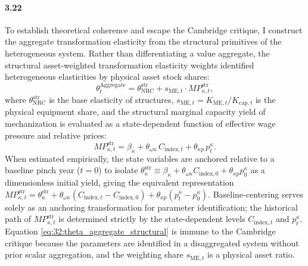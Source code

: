\paragraph{3.22}
To establish theoretical coherence and escape the Cambridge critique, I construct the aggregate transformation elasticity from the structural primitives of the heterogeneous system. Rather than differentiating a value aggregate, the structural asset-weighted transformation elasticity weights identified heterogeneous elasticities by physical asset stock shares:
\begin{equation}
	\theta^{\text{Aggregate}}_t = \theta_{\text{NRC}}^{\text{str}} + s_{\text{ME},t} \cdot MP_{\kappa,t}^{\text{str}},
	\label{eq:32:theta_aggregate_structural}
\end{equation}
where $\theta_{\text{NRC}}^{\text{str}}$ is the base elasticity of structures, $s_{\text{ME},t} = K_{\text{ME},t} / K_{\text{cap},t}$ is the physical equipment share, and the structural marginal capacity yield of mechanization is evaluated as a state-dependent function of effective wage pressure and relative prices:
\begin{equation}
	MP_{\kappa,t}^{\text{str}} = \beta_\kappa + \theta_{\omega\kappa}\, C_{\text{index},t} + \theta_{\kappa p}\, p^\kappa_t.
	\label{eq:32:mp_kappa_level}
\end{equation}
When estimated empirically, the state variables are anchored relative to a baseline pinch year ($t=0$) to isolate $\theta_\kappa^{\text{str}} \equiv \beta_\kappa + \theta_{\omega\kappa} C_{\text{index},0} + \theta_{\kappa p} p^\kappa_0$ as a dimensionless initial yield, giving the equivalent representation $MP_{\kappa,t}^{\text{str}} = \theta_\kappa^{\text{str}} + \theta_{\omega\kappa}(C_{\text{index},t} - C_{\text{index},0}) + \theta_{\kappa p}(p^\kappa_t - p^\kappa_0)$. Baseline-centering serves solely as an anchoring transformation for parameter identification; the historical path of $MP_{\kappa,t}^{\text{str}}$ is determined strictly by the state-dependent levels $C_{\text{index},t}$ and $p^\kappa_t$. Equation \eqref{eq:32:theta_aggregate_structural} is immune to the Cambridge critique because the parameters are identified in a disaggregated system without prior scalar aggregation, and the weighting share $s_{\text{ME},t}$ is a physical asset ratio.
